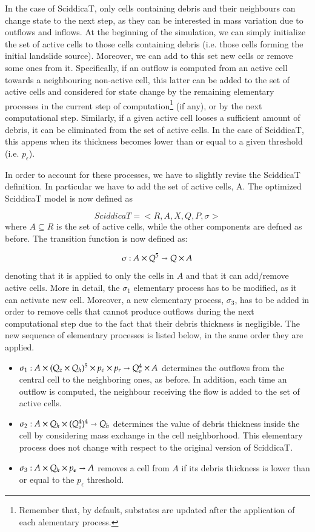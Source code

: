 In the case of SciddicaT, only cells containing debris and their
neighbours can change state to the next step, as they can be
interested in mass variation due to outflows and inflows. At the
beginning of the simulation, we can simply initialize the set of
active cells to those cells containing debris (i.e. those cells
forming the initial landslide source). Moreover, we can add to this
set new cells or remove some ones from it. Specifically, if an outflow
is computed from an active cell towards a neighbouring non-active
cell, this latter can be added to the set of active cells and
considered for state change by the remaining elementary processes in
the current step of computation\footnote{Remember that, by default,
  substates are updated after the application of each alementary
  process.} (if any), or by the next computational step. Similarly, if
a given active cell looses a sufficient amount of debris, it can be
eliminated from the set of active cells. In the case of SciddicaT,
this appens when its thickness becomes lower than or equal to a given
threshold (i.e. $p_\epsilon$).

In order to account for these processes, we have to slightly revise
the SciddicaT definition. In particular we have to add the set of
active cells, A. The optimized SciddicaT model is now defined as

$$SciddicaT = < R, A, X, Q , P, \sigma >$$
where $A \subseteq R$ is the set of active cells, while the other
components are defned as before. The transition function is now defined as:

$$\sigma : A \times Q^5 \shortrightarrow Q \times A$$ denoting that it
is applied to only the cells in $A$ and that it can add/remove active
cells. More in detail, the $\sigma_1$ elementary process has to be
modified, as it can activate new cell. Moreover, a new elementary
process, $\sigma_3$, has to be added in order to remove cells that
cannot produce outflows during the next computational step due to the
fact that their debris thickness is negligible. The new sequence of
elementary processes is listed below, in the same order they are
applied.

\begin{itemize}
\item $\sigma_1 : A \times (Q_z \times Q_h)^5 \times p_\epsilon \times p_r
  \shortrightarrow Q_o^4 \times A$ determines the outflows from the
  central cell to the neighboring ones, as before. In addition, each
  time an outflow is computed, the neighbour receiving the flow is
  added to the set of active cells.

\item $\sigma_2: A \times Q_h \times (Q_o^4)^4 \shortrightarrow Q_h$ determines
  the value of debris thickness inside the cell by considering mass
  exchange in the cell neighborhood. This elementary process does not
  change with respect to the original version of SciddicaT.

\item $\sigma_3: A \times Q_h \times p_\epsilon \shortrightarrow A$
  removes a cell from $A$ if its debris thickness is lower than or
  equal to the $p_\epsilon$ threshold.
\end{itemize}

